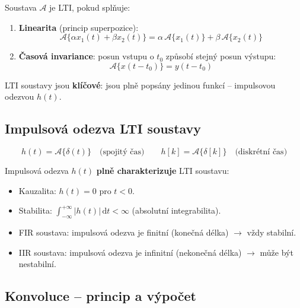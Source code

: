 \documentclass[12pt,a4paper]{article}
\newcommand{\dd}{\mathrm{d}}
\begin{document}
Soustava $\mathcal{A}$ je LTI, pokud splňuje:

\begin{enumerate}
  \item \textbf{Linearita} (princip superpozice):
    \[
      \mathcal{A}\{\alpha x_1(t) + \beta x_2(t)\} = \alpha\,\mathcal{A}\{x_1(t)\} + \beta\,\mathcal{A}\{x_2(t)\}
    \]
  \item \textbf{Časová invariance}: posun vstupu o $t_0$ způsobí stejný posun výstupu:
    \[
      \mathcal{A}\{x(t-t_0)\} = y(t-t_0)
    \]
\end{enumerate}

LTI soustavy jsou \textbf{klíčové}: jsou plně popsány jedinou funkcí – impulsovou odezvou $h(t)$.

\begin{hvezdBox}
\subsection*{Impulsová odezva LTI soustavy}
\end{hvezdBox}

\begin{matBox}[Definice]
\[
  h(t) = \mathcal{A}\{\delta(t)\} \quad \text{(spojitý čas)}
  \qquad
  h[k] = \mathcal{A}\{\delta[k]\} \quad \text{(diskrétní čas)}
\]
\end{matBox}

Impulsová odezva $h(t)$ \textbf{plně charakterizuje} LTI soustavu:
\begin{itemize}
  \item Kauzalita: $h(t) = 0$ pro $t < 0$.
  \item Stabilita: $\displaystyle\int_{-\infty}^{+\infty} |h(t)|\,\dd t < \infty$ (absolutní integrabilita).
  \item FIR soustava: impulsová odezva je finitní (konečná délka) $\to$ vždy stabilní.
  \item IIR soustava: impulsová odezva je infinitní (nekonečná délka) $\to$ může být nestabilní.
\end{itemize}

\begin{hvezdBox}
\subsection*{Konvoluce – princip a výpočet}
\end{hvezdBox}
\end{document}
